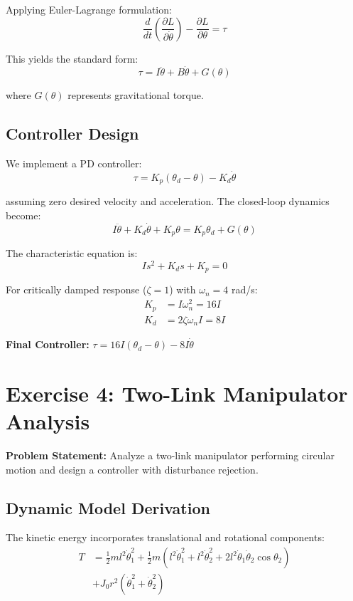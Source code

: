 \documentclass{article}
\begin{document}
Applying Euler-Lagrange formulation:
\[
\frac{d}{dt}\left(\frac{\partial L}{\partial \dot{\theta}}\right) - \frac{\partial L}{\partial \theta} = \tau
\]

This yields the standard form:
\[
\tau = I\ddot{\theta} + B\dot{\theta} + G(\theta)
\]

where $G(\theta)$ represents gravitational torque.

\subsection*{Controller Design}

We implement a PD controller:
\[
\tau = K_p (\theta_d - \theta) - K_d \dot{\theta}
\]

assuming zero desired velocity and acceleration. The closed-loop dynamics become:
\[
I\ddot{\theta} + K_d \dot{\theta} + K_p \theta = K_p \theta_d + G(\theta)
\]

The characteristic equation is:
\[
Is^2 + K_d s + K_p = 0
\]

For critically damped response ($\zeta = 1$) with $\omega_n = 4$ rad/s:
\begin{align}
K_p &= I\omega_n^2 = 16I \\
K_d &= 2\zeta\omega_n I = 8I
\end{align}

\textbf{Final Controller:} $\tau = 16I(\theta_d - \theta) - 8I\dot{\theta}$

\section{Exercise 4: Two-Link Manipulator Analysis}

\textbf{Problem Statement:} Analyze a two-link manipulator performing circular motion and design a controller with disturbance rejection.

\subsection*{Dynamic Model Derivation}

The kinetic energy incorporates translational and rotational components:
\begin{align}
T &= \frac{1}{2}m l^2 \dot{\theta}_1^2 + \frac{1}{2}m (l^2 \dot{\theta}_1^2 + l^2 \dot{\theta}_2^2 + 2l^2 \dot{\theta}_1 \dot{\theta}_2 \cos \theta_2) \\
&+ J_0 r^2(\dot{\theta}_1^2 + \dot{\theta}_2^2)
\end{align}
\end{document}
